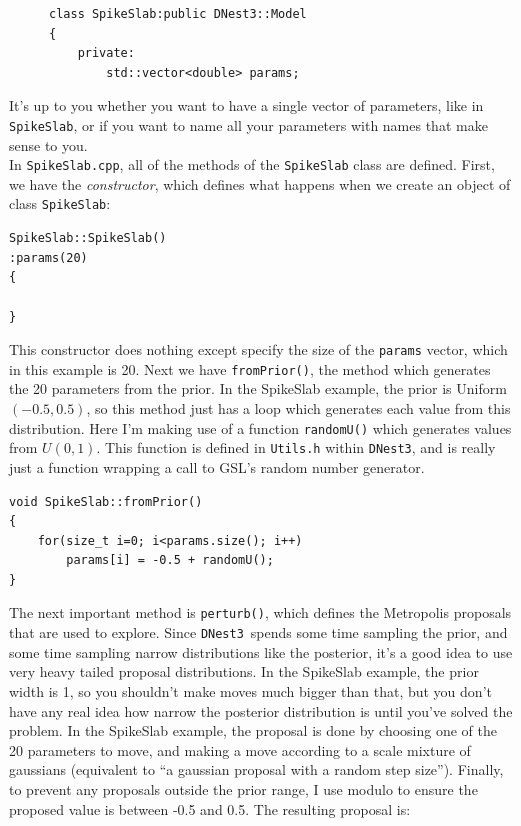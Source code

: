 \documentclass[a4paper, 11pt]{article}
\newcommand{\dnest}{{\tt DNest3}}
\begin{document}
\begin{figure}
\begin{framed}
\begin{verbatim}
class SpikeSlab:public DNest3::Model
{
    private:
        std::vector<double> params;
\end{verbatim}
\end{framed}
\end{figure}

It's up to you whether you want to have a single vector of parameters, like
in {\tt SpikeSlab}, or if you want to name all your parameters with names that
make sense to you.\\

In {\tt SpikeSlab.cpp}, all of the methods of the {\tt SpikeSlab} class
are defined. First, we have the {\it constructor}, which defines what happens
when we create an object of class {\tt SpikeSlab}:\\

\begin{framed}
\begin{verbatim}
SpikeSlab::SpikeSlab()
:params(20)
{

}
\end{verbatim}
\end{framed}

This constructor does nothing except specify the size of the {\tt params}
vector, which in this example is 20. Next we have {\tt fromPrior()}, the
method which generates the 20 parameters from the prior. In the SpikeSlab
example, the prior is Uniform$(-0.5, 0.5)$, so this method just has a loop
which generates each value from this distribution. Here I'm making use of
a function {\tt randomU()} which generates values from $U(0, 1)$. This function
is defined in {\tt Utils.h} within \dnest, and is really just a function
wrapping a call to GSL's random number generator.\\

\begin{framed}
\begin{verbatim}
void SpikeSlab::fromPrior()
{
    for(size_t i=0; i<params.size(); i++)
        params[i] = -0.5 + randomU();
}
\end{verbatim}
\end{framed}

The next important method is {\tt perturb()}, which defines the Metropolis
proposals that are used to explore. Since \dnest~spends some time sampling
the prior, and some time sampling narrow distributions like the posterior,
it's a good idea to use very heavy tailed proposal distributions. In the
SpikeSlab example, the prior width is 1, so you shouldn't make moves much
bigger than that, but you don't have any real idea how narrow the posterior
distribution is until you've solved the problem. In the SpikeSlab example,
the proposal is done by choosing one of the 20 parameters to move, and making
a move according to a scale mixture of gaussians (equivalent to ``a gaussian
proposal with a random step size''). Finally, to prevent any proposals outside
the prior range, I use modulo to ensure the proposed value is between -0.5
and 0.5. The resulting proposal is:\\
\end{document}
